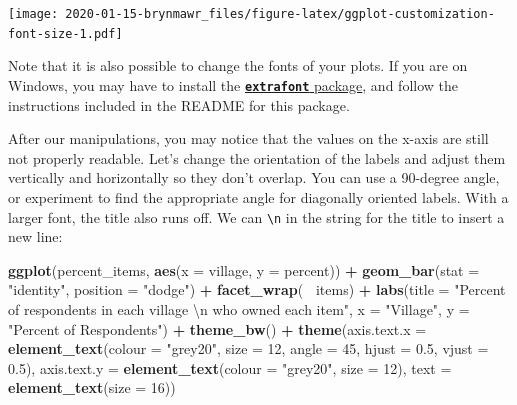\documentclass[]{book}
\newenvironment{Shaded}{\begin{snugshade}}{\end{snugshade}}
\newcommand{\KeywordTok}[1]{\textcolor[rgb]{0.13,0.29,0.53}{\textbf{#1}}}
\newcommand{\DataTypeTok}[1]{\textcolor[rgb]{0.13,0.29,0.53}{#1}}
\newcommand{\DecValTok}[1]{\textcolor[rgb]{0.00,0.00,0.81}{#1}}
\newcommand{\FloatTok}[1]{\textcolor[rgb]{0.00,0.00,0.81}{#1}}
\newcommand{\CharTok}[1]{\textcolor[rgb]{0.31,0.60,0.02}{#1}}
\newcommand{\StringTok}[1]{\textcolor[rgb]{0.31,0.60,0.02}{#1}}
\newcommand{\OperatorTok}[1]{\textcolor[rgb]{0.81,0.36,0.00}{\textbf{#1}}}
\newcommand{\NormalTok}[1]{#1}
\begin{document}
\texttt{[image: 2020-01-15-brynmawr\_files/figure-latex/ggplot-customization-font-size-1.pdf]}

Note that it is also possible to change the fonts of your plots. If you
are on Windows, you may have to install the
\href{https://github.com/wch/extrafont}{\textbf{\texttt{extrafont}}
package}, and follow the instructions included in the README for this
package.

After our manipulations, you may notice that the values on the x-axis
are still not properly readable. Let's change the orientation of the
labels and adjust them vertically and horizontally so they don't
overlap. You can use a 90-degree angle, or experiment to find the
appropriate angle for diagonally oriented labels. With a larger font,
the title also runs off. We can \texttt{\textbackslash{}n} in the string
for the title to insert a new line:

\begin{Shaded}
\begin{Highlighting}[]
\KeywordTok{ggplot}\NormalTok{(percent_items, }\KeywordTok{aes}\NormalTok{(}\DataTypeTok{x =}\NormalTok{ village, }\DataTypeTok{y =}\NormalTok{ percent)) }\OperatorTok{+}
\StringTok{    }\KeywordTok{geom_bar}\NormalTok{(}\DataTypeTok{stat =} \StringTok{"identity"}\NormalTok{, }\DataTypeTok{position =} \StringTok{"dodge"}\NormalTok{) }\OperatorTok{+}
\StringTok{    }\KeywordTok{facet_wrap}\NormalTok{(}\OperatorTok{~}\StringTok{ }\NormalTok{items) }\OperatorTok{+}
\StringTok{    }\KeywordTok{labs}\NormalTok{(}\DataTypeTok{title =} \StringTok{"Percent of respondents in each village }\CharTok{\textbackslash{}n}\StringTok{ who owned each item"}\NormalTok{,}
         \DataTypeTok{x =} \StringTok{"Village"}\NormalTok{,}
         \DataTypeTok{y =} \StringTok{"Percent of Respondents"}\NormalTok{) }\OperatorTok{+}
\StringTok{    }\KeywordTok{theme_bw}\NormalTok{() }\OperatorTok{+}
\StringTok{    }\KeywordTok{theme}\NormalTok{(}\DataTypeTok{axis.text.x =} \KeywordTok{element_text}\NormalTok{(}\DataTypeTok{colour =} \StringTok{"grey20"}\NormalTok{, }\DataTypeTok{size =} \DecValTok{12}\NormalTok{, }\DataTypeTok{angle =} \DecValTok{45}\NormalTok{, }\DataTypeTok{hjust =} \FloatTok{0.5}\NormalTok{, }\DataTypeTok{vjust =} \FloatTok{0.5}\NormalTok{),}
          \DataTypeTok{axis.text.y =} \KeywordTok{element_text}\NormalTok{(}\DataTypeTok{colour =} \StringTok{"grey20"}\NormalTok{, }\DataTypeTok{size =} \DecValTok{12}\NormalTok{),}
          \DataTypeTok{text =} \KeywordTok{element_text}\NormalTok{(}\DataTypeTok{size =} \DecValTok{16}\NormalTok{))}
\end{Highlighting}
\end{Shaded}
\end{document}

